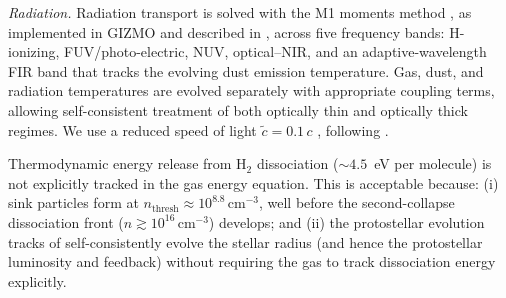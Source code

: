 \textit{Radiation.}
Radiation transport is solved with the M1 moments method
\citep{Levermore_1984}, as implemented in {\small GIZMO} and
described in \citet{FORGE_d_in_FIRE_Hopkin_2023,STARFORGE_Towa_Grudic_2021},
across five frequency bands: H-ionizing, FUV/photo-electric, NUV,
optical--NIR, and an adaptive-wavelength FIR band that tracks the
evolving dust emission temperature.
Gas, dust, and radiation temperatures are evolved separately with
appropriate coupling terms, allowing self-consistent treatment of
both optically thin and optically thick regimes.
We use a reduced speed of light $\tilde{c} = 0.1\,c$
,
following \citet{FORGE_d_in_FIRE_Hopkin_2023}.




Thermodynamic energy release from H$_2$ dissociation
($\sim 4.5$~eV per molecule) is not explicitly tracked in the gas
energy equation.
This is acceptable because: (i) sink particles form at
$n_\mathrm{thresh} \approx 10^{8.8}\,\mathrm{cm}^{-3}$, well
before the second-collapse dissociation front
($n \gtrsim 10^{16}\,\mathrm{cm}^{-3}$) develops; and (ii)
the protostellar evolution tracks of \citet{Offner_2009}
self-consistently evolve the stellar radius (and hence the
protostellar luminosity and feedback) without requiring the gas
to track dissociation energy explicitly.



